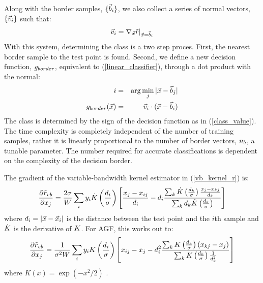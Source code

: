 Along with the border samples,  $\lbrace \vec b_i \rbrace$, we also
collect a series of normal vectors, $\lbrace \vec v_i \rbrace$
such that:
\begin{equation}
\vec v_i=\nabla_{\vec {x}}{\tilde r |_{\vec {x}=\vec b_i}}
\end{equation}
With this system, determining the class is a two step proces.
First, the nearest border sample to the test point is found.
Second, we define a new decision function, $g_{border}$, 
equivalent to (\ref{linear_classifier}), through a dot product with the normal:
\begin{eqnarray}
	i & = & \arg \min_j |\vec {x} - \vec b_j| \\ \nonumber
	g_{border}(\vec {x}) & = & \vec v_i \cdot (\vec {x} - \vec b_i)
	\label{border_decision}
\end{eqnarray}
The class is determined by the sign of the decision function as in 
(\ref{class_value}).
The time complexity is completely independent of the number
of training samples, rather it is linearly proportional to the number of
border vectors, $n_b$, a tunable parameter. The number required for
accurate classifications is dependent on the complexity of the decision
border.

The gradient of the variable-bandwidth kernel estimator in 
(\ref{vb_kernel_r}) is:
\begin{equation}
	\frac{\partial \tilde r_{vb}}{\partial x_j} = 
	\frac{2 \sigma}{W} \sum_i y_i
	\dot {K} \left (\frac{d_i}{\sigma} \right )
	\left [\frac{x_j - x_{ij}}{d_i} 
	- d_i \frac{\sum_k \dot {K} \left (\frac{d_k}{\sigma} \right )
	\frac{x_j - x_{kj}}{d_k}}
{\sum_k d_k \dot {K} \left (\frac{d_k}{\sigma} \right )} \right ]
\label{kernel_gradient}
\end{equation}
where $d_i=|\vec {x} - \vec {x}_i|$ is the distance between the 
test point and the $i$th sample and $\dot {K}$ is the derivative
of $K$.
For AGF, this works out to:
\begin{equation}
	\frac{\partial \tilde r_{vb}}{\partial x_j} = 
	\frac{1}{\sigma^2 W} \sum_i y_i
	K \left (\frac{d_i}{\sigma} \right )
	\left [x_{ij} - x_j
	- d_i^2 \frac{\sum_k K \left (\frac{d_k}{\sigma} \right )
	\left (x_{kj} - x_j \right )}
{\sum_k K \left (\frac{d_k}{\sigma} \right )\frac{1}{d_k^2}} \right ]
\label{vb_gradient}
\end{equation}
where $K(x)=\exp(-x^2/2)$ \citep{Mills2011}.

